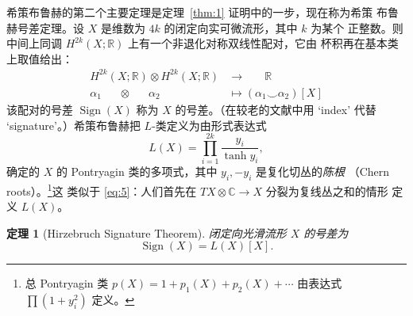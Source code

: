 \documentclass[11pt]{amsart}
\theoremstyle{definition}
\theoremstyle{remark}
\theoremstyle{plain}
\newtheorem{theorem}[equation]{定理}
\numberwithin{equation}{section}
\renewcommand{\:}{\colon}
\newcommand{\CC}{{\mathbb C}}
\newcommand{\RR}{{\mathbb R}}
\DeclareMathOperator{\ind}{ind}
\DeclareMathOperator{\Sign}{Sign}
\begin{document}
希策布鲁赫的第二个主要定理是定理~\ref{thm:1} 证明中的一步，现在称为希策
布鲁赫号差定理。设 $X$ 是维数为 $4k$ 的闭定向实可微流形，其中 $k$ 为某个
正整数。则中间上同调 $H^{2k}(X;\RR)$ 上有一个非退化对称双线性配对，它由
杯积再在基本类上取值给出：
  \begin{equation}\label{eq:8}
     \begin{aligned} H^{2k}(X;\RR) \otimes H^{2k}(X;\RR) &\longrightarrow
     \quad\;\;\,\RR\\ \alpha _1 \quad \;\; \otimes \quad\;\; \alpha_2 \quad\quad
     &\longmapsto 
     (\alpha _1 
     \smallsmile \alpha_2 )[X]\end{aligned}
  \end{equation}
该配对的号差 $\Sign(X)$ 称为 $X$ 的号差。（在较老的文献中用 `index' 代替
`signature'。）希策布鲁赫把 $L$-类定义为由形式表达式
  \begin{equation}\label{eq:9}
     L(X) = \prod_{i=1}^{2k} \frac{y_i}{\tanh y_i},
  \end{equation}
确定的 $X$ 的 Pontryagin 类的多项式，其中 $y_i, -y_i$ 是复化切丛的\emph{陈根}
（Chern roots）。\footnote{总 Pontryagin 类
$p(X) = 1 + p_1(X) + p_2(X)+\cdots $ 由表达式 $\prod(1 + y_i^2)$ 定义。}这
类似于 \eqref{eq:5}：人们首先在 $TX\otimes \CC\to X$ 分裂为复线丛之和的情形
定义 $L(X)$。




\begin{theorem}[Hirzebruch Signature Theorem]\label{thm:3}
闭定向光滑流形 $X$ 的号差为
  \begin{equation}\label{eq:10}
     \Sign(X) = L(X)[X].
  \end{equation}
\end{theorem}
\end{document}

